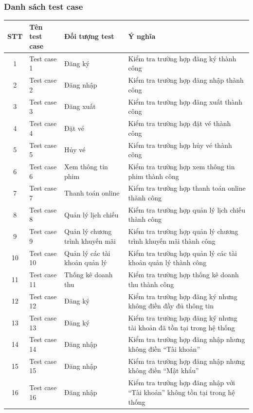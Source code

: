 \documentclass[a4paper, 12pt]{article}
\begin{document}
\subsubsection{Danh sách test case}
	\begin{tabular}{|c|l|l|l|}
		\hline
		STT&Tên test case & Đối tượng test&  Ý nghĩa\\
		\hline
		1&Test case 1&Đăng ký&Kiểm tra trường hợp đăng ký thành công \\
		\hline
		2&Test case 2&Đăng nhập&Kiểm tra trường hợp đăng nhập thành công\\
		\hline
		3&
		Test case 3&
		Đăng xuất &
		Kiểm tra trường hợp đăng xuất thành công\\
		\hline
		4&
		Test case 4&
		Đặt vé&
		Kiểm tra trường hợp đặt vé thành công\\
		\hline
		5&
		Test case 5&
		Hủy vé&
		Kiểm tra trường hợp hủy vé thành công\\
		\hline
		6&
		Test case 6&
		Xem thông tin phim&
		Kiểm tra trường hợp xem thông tin phim thành công\\
		\hline
		7&
		Test case 7&
		Thanh toán online&
		Kiểm tra trường hợp thanh toán online thành công\\
		\hline
		8&
		Test case 8&
		Quản lý lịch chiếu&
		Kiểm tra trường hợp quản lý lịch chiếu thành công\\
		\hline		
		9&
		Test case 9&
		Quản lý chương trình khuyến mãi&
		Kiểm tra trường hợp quản lý chương trình khuyến mãi thành công\\
		\hline
		10&
		Test case 10&
		Quản lý các tài khoản quản lý&
		Kiểm tra trường hợp quản lý các tài khoản quản lý thành công\\
		\hline
		11&
		Test case 11&
		Thống kê doanh thu&
		Kiểm tra trường hợp thống kê doanh thu thành công\\
		\hline
		12&
		Test case 12&
		Đăng ký&
		Kiểm tra trường hợp đăng ký nhưng không điền đầy đủ thông tin\\
		\hline
		13&
		Test case 13&
		Đăng ký&
		Kiểm tra trường hợp đăng ký nhưng tài khoản đã tồn tại trong hệ thống\\
		\hline		
		14&
		Test case 14&
		Đăng nhập&
		Kiểm tra trường hợp đăng nhập nhưng không điền “Tài khoản”\\
		\hline
		15 &
		Test case 15&
		Đăng nhập&
		Kiểm tra trường hợp đăng nhập nhưng không điền “Mật khẩu”\\
		\hline
		16&
		Test case 16&
		Đăng nhập&
		Kiểm tra trường hợp đăng nhập với “Tài khoản” không tồn tại trong hệ thống\\

\end{tabular}
\end{document}
